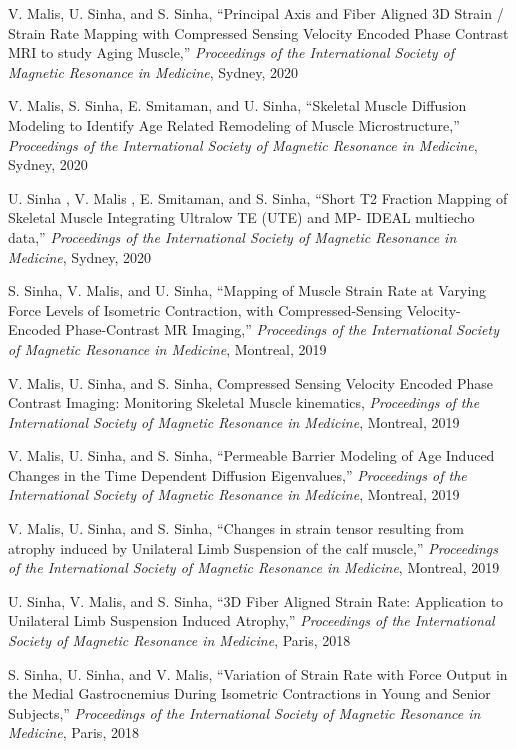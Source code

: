 \begin{frontmatter}
\begin{vitapage}
\begin{talks}	
	\item V. Malis, U. Sinha, and S. Sinha, ``Principal Axis and Fiber Aligned 3D Strain / Strain Rate Mapping with Compressed Sensing Velocity Encoded Phase Contrast MRI to study Aging Muscle,'' \emph{Proceedings of the International Society of Magnetic Resonance in Medicine}, Sydney, 2020
	\item V. Malis, S. Sinha, E. Smitaman, and U. Sinha, ``Skeletal Muscle Diffusion Modeling to Identify Age Related Remodeling of Muscle Microstructure,'' \emph{Proceedings of the International Society of Magnetic Resonance in Medicine}, Sydney, 2020
	\item U. Sinha , V. Malis , E. Smitaman, and S. Sinha, ``Short T2 Fraction Mapping of Skeletal Muscle Integrating Ultralow TE (UTE) and MP- IDEAL multiecho data,'' \emph{Proceedings of the International Society of Magnetic Resonance in Medicine}, Sydney, 2020
	\item S. Sinha, V. Malis, and U. Sinha, ``Mapping of Muscle Strain Rate at Varying Force Levels of Isometric Contraction, with Compressed-Sensing Velocity-Encoded Phase-Contrast MR Imaging,'' \emph{Proceedings of the International Society of Magnetic Resonance in Medicine}, Montreal, 2019
	\item V. Malis, U. Sinha, and S. Sinha, Compressed Sensing Velocity Encoded Phase Contrast Imaging: Monitoring Skeletal Muscle kinematics, \emph{Proceedings of the International Society of Magnetic Resonance in Medicine}, Montreal, 2019
	\item V. Malis, U. Sinha, and S. Sinha, ``Permeable Barrier Modeling of Age Induced Changes in the Time Dependent Diffusion Eigenvalues,'' \emph{Proceedings of the International Society of Magnetic Resonance in Medicine}, Montreal, 2019
	\item V. Malis, U. Sinha, and S. Sinha, ``Changes in strain tensor resulting from atrophy induced by Unilateral Limb Suspension of the calf muscle,'' \emph{Proceedings of the International Society of Magnetic Resonance in Medicine}, Montreal, 2019
	\item U. Sinha, V. Malis, and S. Sinha, ``3D Fiber Aligned Strain Rate: Application to Unilateral Limb Suspension Induced Atrophy,'' \emph{Proceedings of the International Society of Magnetic Resonance in Medicine}, Paris, 2018
	\item S. Sinha, U. Sinha, and V. Malis, ``Variation of Strain Rate with Force Output in the Medial Gastrocnemius During Isometric Contractions in Young and Senior Subjects,'' \emph{Proceedings of the International Society of Magnetic Resonance in Medicine}, Paris, 2018

\end{talks}
\end{vitapage}
\end{frontmatter}
